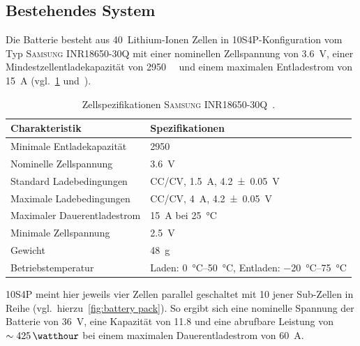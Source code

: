 		\subsection{Bestehendes System}
			Die Batterie besteht aus 40~Lithium-Ionen Zellen in 10S4P-Konfiguration vom Typ \textsc{Samsung INR18650-30Q} mit einer nominellen Zellspannung von \qty{3,6}{\volt}, einer Mindestzellentladekapazität von \qty{2950}{\milli\amperehour} und einem maximalen Entladestrom von \qty{15}{\ampere} (vgl.~\cref{tab:cellspecifications} und~\cite{INR18650.30Q.Specs.202202}).
			\begin{table}[h]
				\caption[Zellspezifikationen \textsc{Samsung INR18650-30Q}]{Zellspezifikationen \textsc{Samsung INR18650-30Q}~\cite{INR18650.30Q.Specs.202202}.}\label{tab:cellspecifications}
				\centering
				\begin{tabular}{@{}ll@{}}
					\toprule
					Charakteristik				& Spezifikationen \\ \midrule
					Minimale Entladekapazität	& \qty{2950}{\milli\amperehour} \\
					Nominelle Zellspannung		& \qty{3,6}{\volt} \\
					Standard Ladebedingungen	& CC/CV, \qty{1,5}{\ampere}, \qty{4,2 +- 0,05}{\volt} \\
					Maximale Ladebedingungen	& CC/CV, \qty{4}{\ampere}, \qty{4,2 +- 0,05}{\volt} \\
					Maximaler Dauerentladestrom & \qty{15}{\ampere} bei \qty{25}{\degreeCelsius} \\
					Minimale Zellspannung		& \qty{2,5}{\volt} \\
					Gewicht						& \qty{48}{\gram} \\
					Betriebstemperatur			& Laden: \qtyrange{0}{50}{\degreeCelsius}, Entladen: \qtyrange{-20}{75}{\degreeCelsius} \\ \bottomrule
				\end{tabular}
			\end{table}
			10S4P meint hier jeweils vier Zellen parallel geschaltet mit 10 jener Sub-Zellen in Reihe (vgl.~hierzu~\cref{fig:battery pack}).
			So ergibt sich eine nominelle Spannung der Batterie von \qty{36}{\volt}, eine Kapazität von \qty{11,8}{\amperehour} und eine abrufbare Leistung von \(\sim \SI{425}{\watthour}\) bei einem maximalen Dauerentladestrom von \SI{60}{\ampere}.
